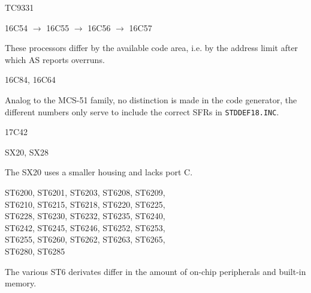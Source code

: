 \documentclass[12pt,twoside]{report}
\newcommand{\tty}[1]{{\tt #1}}
\newcommand{\asname}{{AS}}
\begin{document}
\begin{cpulist}
   TC9331
\end{cpulist}
\begin{cpulist}
   16C54 $\rightarrow$ 16C55 $\rightarrow$ 16C56 $\rightarrow$ 16C57
\end{cpulist}
These processors differ by the available code area, i.e. by the address
limit after which \asname{} reports overruns.
\begin{cpulist}
   16C84, 16C64
\end{cpulist}
Analog to the MCS-51 family, no distinction is made in the code generator,
the different numbers only serve to include the correct SFRs in
\tty{STDDEF18.INC}.
\begin{cpulist}
   17C42
\end{cpulist}
\begin{cpulist}
   SX20, SX28
\end{cpulist}
The SX20 uses a smaller housing and lacks port C.
\begin{cpulist}
   ST6200, ST6201, ST6203, ST6208, ST6209,\\
\> ST6210, ST6215, ST6218, ST6220, ST6225,\\
\> ST6228, ST6230, ST6232, ST6235, ST6240,\\
\> ST6242, ST6245, ST6246, ST6252, ST6253,\\
\> ST6255, ST6260, ST6262, ST6263, ST6265,\\
\> ST6280, ST6285
\end{cpulist}
The various ST6 derivates differ in the amount of
on-chip peripherals and built-in memory.
\end{document}
